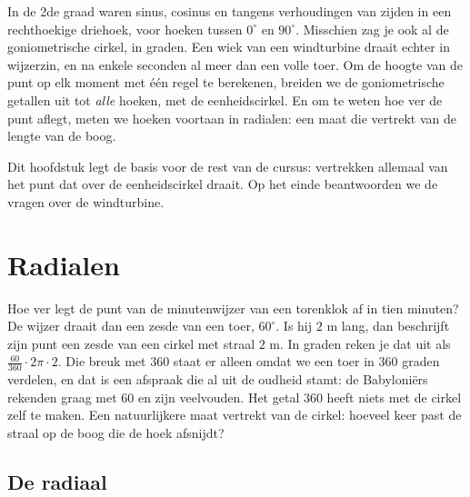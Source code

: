 In de 2de graad waren sinus, cosinus en tangens verhoudingen van zijden in een rechthoekige driehoek, voor hoeken tussen $0^\circ$ en $90^\circ$. Misschien zag je ook al de goniometrische cirkel, in graden. Een wiek van een windturbine draait echter in wijzerzin, en na enkele seconden al meer dan een volle toer. Om de hoogte van de punt op elk moment met één regel te berekenen, breiden we de goniometrische getallen uit tot \textit{alle} hoeken, met de eenheidscirkel. En om te weten hoe ver de punt aflegt, meten we hoeken voortaan in radialen: een maat die vertrekt van de lengte van de boog.

Dit hoofdstuk legt de basis voor de rest van de cursus:  vertrekken allemaal van het punt dat over de eenheidscirkel draait. Op het einde beantwoorden we de vragen over de windturbine.

\begin{oefeningen}[Start]

\end{oefeningen}

\section{Radialen}

Hoe ver legt de punt van de minutenwijzer van een torenklok af in tien minuten? De wijzer draait dan een zesde van een toer, $60^\circ$. Is hij $2$ m lang, dan beschrijft zijn punt een zesde van een cirkel met straal $2$ m. In graden reken je dat uit als $\frac{60}{360} \cdot 2\pi \cdot 2$. Die breuk met $360$ staat er alleen omdat we een toer in $360$ graden verdelen, en dat is een afspraak die al uit de oudheid stamt: de Babyloniërs rekenden graag met $60$ en zijn veelvouden. Het getal $360$ heeft niets met de cirkel zelf te maken. Een natuurlijkere maat vertrekt van de cirkel: hoeveel keer past de straal op de boog die de hoek afsnijdt?

\subsection{De radiaal}

